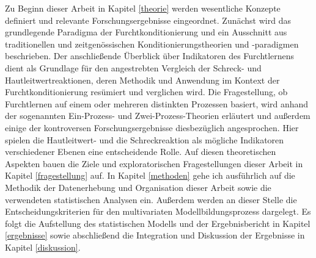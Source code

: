 	Zu Beginn dieser Arbeit in Kapitel \ref{theorie} werden wesentliche Konzepte definiert und relevante Forschungsergebnisse eingeordnet. 
	Zunächst wird das grundlegende Paradigma der Furchtkonditionierung und ein Ausschnitt aus traditionellen und zeitgenössischen Konditionierungstheorien und -paradigmen beschrieben. 
	Der anschließende Überblick über Indikatoren des Furchtlernens dient als Grundlage für den angestrebten Vergleich der Schreck- und Hautleitwertreaktionen, deren Methodik und Anwendung im Kontext der Furchtkonditionierung resümiert und verglichen wird.   
	Die Fragestellung, ob Furchtlernen auf einem oder mehreren distinkten Prozessen basiert, wird anhand der sogenannten Ein-Prozess- und Zwei-Prozess-Theorien erläutert und außerdem einige der kontroversen Forschungsergebnisse diesbezüglich angesprochen. Hier spielen die Hautleitwert- und die Schreckreaktion als mögliche Indikatoren verschiedener Ebenen eine entscheidende Rolle.
	Auf diesen theoretischen Aspekten bauen die Ziele und exploratorischen Fragestellungen dieser Arbeit in Kapitel \ref{fragestellung} auf. In Kapitel \ref{methoden} gehe ich ausführlich auf die Methodik der Datenerhebung und Organisation dieser Arbeit sowie die verwendeten statistischen Analysen ein. Außerdem werden an dieser Stelle die Entscheidungskriterien für den multivariaten Modellbildungsprozess dargelegt. 
	Es folgt die Aufstellung des statistischen Modells und der Ergebnisbericht in Kapitel \ref{ergebnisse} sowie abschließend die Integration und Diskussion der Ergebnisse in Kapitel \ref{diskussion}. 



		
